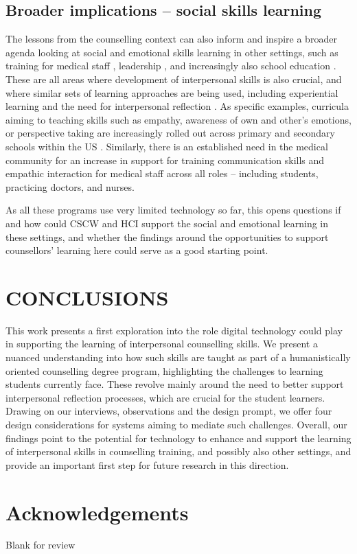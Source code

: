 \documentclass{sigchi}
\begin{document}
\subsection{Broader implications -- social skills learning}
The lessons from the counselling context can also inform and inspire a broader agenda looking at social and emotional skills learning in other settings, such as training for medical staff \cite{Barth2011,Stepien2006}, leadership \cite{Bono2009}, and increasingly also school education \cite{Durlak2011}. These are all areas where development of interpersonal skills is also crucial, and where similar sets of learning approaches are being used, including experiential learning and the need for interpersonal reflection \cite{Zins2007}. As specific examples, curricula aiming to teaching skills such as empathy, awareness of own and other's emotions, or perspective taking are increasingly rolled out across primary and secondary schools within the US \cite{Durlak2011,Weare2011}. Similarly, there is an established need in the medical community for an increase in support for training communication skills and empathic interaction for medical staff across all roles \cite{Barth2011,Satterfield2007,Stepien2006} -- including students, practicing doctors, and nurses. 

As all these programs use very limited technology so far, this opens questions if and how could CSCW and HCI support the social and emotional learning in these settings, and whether the findings around the opportunities to support counsellors' learning here could serve as a good starting point. 



\section{CONCLUSIONS}
This work presents a first exploration into the role digital technology could play in supporting the learning of interpersonal counselling skills. We present a nuanced understanding into how such skills are taught as part of a humanistically oriented counselling degree program, highlighting the challenges to learning students currently face. These revolve mainly around the need to better support interpersonal reflection processes, which are crucial for the student learners. Drawing on our interviews, observations and the design prompt, we offer four design considerations for systems aiming to mediate such challenges. Overall, our findings point to the potential for technology to enhance and support the learning of interpersonal skills in counselling training, and possibly also other settings, and provide an important first step for future research in this direction. 










\section{Acknowledgements}
Blank for review  




 
\end{document}
